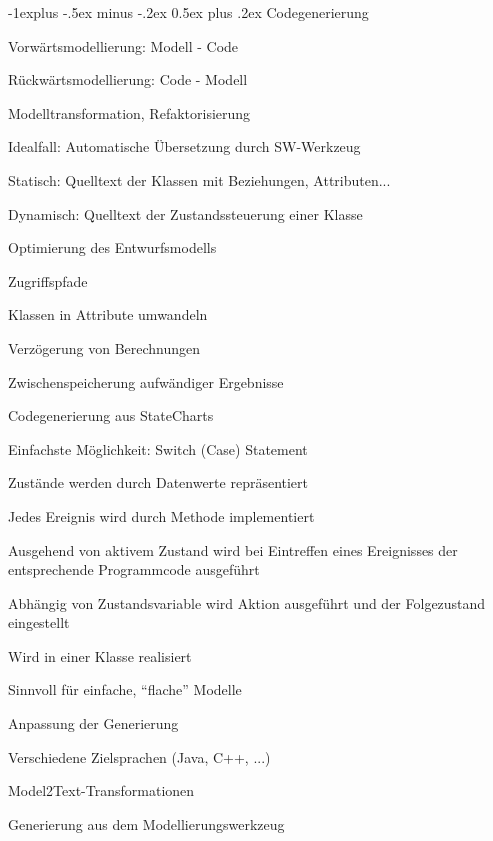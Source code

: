 \documentclass[a4paper]{article}
\makeatletter
\renewcommand{\subsection}{\@startsection{subsection}{2}{0mm}%
                                {-1explus -.5ex minus -.2ex}%
                                {0.5ex plus .2ex}%
                                {\normalfont\normalsize\bfseries}}
\makeatother
\begin{document}
\begin{multicols}{3}
  \subsection{Codegenerierung}
  \begin{itemize*}
    \item Vorwärtsmodellierung: Modell - Code
    \item Rückwärtsmodellierung: Code - Modell
    \item Modelltransformation, Refaktorisierung
    \item Idealfall: Automatische Übersetzung durch SW-Werkzeug
    \item Statisch: Quelltext der Klassen mit Beziehungen, Attributen...
    \item Dynamisch: Quelltext der Zustandssteuerung einer Klasse
  \end{itemize*}

  Optimierung des Entwurfsmodells
  \begin{itemize*}
    \item Zugriffspfade
    \item Klassen in Attribute umwandeln
    \item Verzögerung von Berechnungen
    \item Zwischenspeicherung aufwändiger Ergebnisse
  \end{itemize*}

  Codegenerierung aus StateCharts
  \begin{itemize*}
    \item Einfachste Möglichkeit: Switch (Case) Statement
    \item Zustände werden durch Datenwerte repräsentiert
    \item Jedes Ereignis wird durch Methode implementiert
    \item Ausgehend von aktivem Zustand wird bei Eintreffen eines Ereignisses der entsprechende Programmcode ausgeführt
    \item Abhängig von Zustandsvariable wird Aktion ausgeführt und der Folgezustand eingestellt
    \item Wird in einer Klasse realisiert
    \item Sinnvoll für einfache, “flache” Modelle
  \end{itemize*}

  Anpassung der Generierung
  \begin{itemize*}
    \item Verschiedene Zielsprachen (Java, C++, ...)
    \item Model2Text-Transformationen
    \item Generierung aus dem Modellierungswerkzeug
  \end{itemize*}


\end{multicols}
\end{document}
